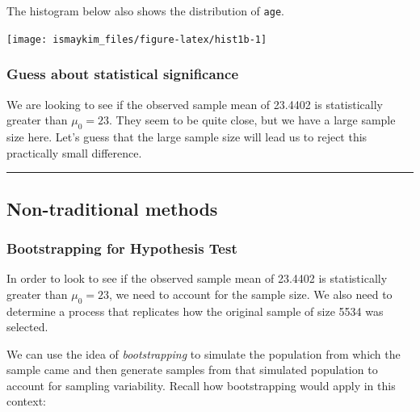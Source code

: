 \documentclass[]{tufte-book}
\newenvironment{Shaded}{\begin{snugshade}}{\end{snugshade}}
\newcommand{\KeywordTok}[1]{\textcolor[rgb]{0.13,0.29,0.53}{\textbf{{#1}}}}
\newcommand{\DataTypeTok}[1]{\textcolor[rgb]{0.13,0.29,0.53}{{#1}}}
\newcommand{\DecValTok}[1]{\textcolor[rgb]{0.00,0.00,0.81}{{#1}}}
\newcommand{\StringTok}[1]{\textcolor[rgb]{0.31,0.60,0.02}{{#1}}}
\newcommand{\NormalTok}[1]{{#1}}
\let\oldrule=\rule
\renewcommand{\rule}[1]{\oldrule{\linewidth}}
\theoremstyle{definition}
\theoremstyle{definition}
\theoremstyle{remark}
\begin{document}
The histogram below also shows the distribution of \texttt{age}.

\begin{Shaded}
\end{Shaded}

\begin{center}\texttt{[image: ismaykim\_files/figure-latex/hist1b-1]} \end{center}

\subsubsection{Guess about statistical
significance}\label{guess-about-statistical-significance}

We are looking to see if the observed sample mean of 23.4402 is
statistically greater than \(\mu_0 = 23\). They seem to be quite close,
but we have a large sample size here. Let's guess that the large sample
size will lead us to reject this practically small difference.

\begin{center}\rule{0.5\linewidth}{\linethickness}\end{center}

\subsection{Non-traditional methods}\label{non-traditional-methods}

\subsubsection{Bootstrapping for Hypothesis
Test}\label{bootstrapping-for-hypothesis-test}

In order to look to see if the observed sample mean of 23.4402 is
statistically greater than \(\mu_0 = 23\), we need to account for the
sample size. We also need to determine a process that replicates how the
original sample of size 5534 was selected.

We can use the idea of \emph{bootstrapping} to simulate the population
from which the sample came and then generate samples from that simulated
population to account for sampling variability. Recall how bootstrapping
would apply in this context:
\end{document}
